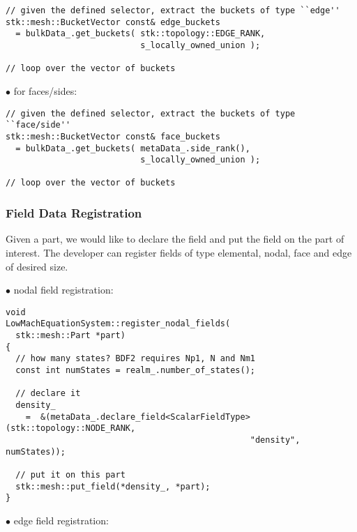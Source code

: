 \begin{lstlisting}
// given the defined selector, extract the buckets of type ``edge''
stk::mesh::BucketVector const& edge_buckets 
  = bulkData_.get_buckets( stk::topology::EDGE_RANK, 
                           s_locally_owned_union );

// loop over the vector of buckets 
\end{lstlisting}


\begin{description}
\item[$\bullet$ for faces/sides:]
\end{description}

\begin{lstlisting}
// given the defined selector, extract the buckets of type ``face/side''
stk::mesh::BucketVector const& face_buckets 
  = bulkData_.get_buckets( metaData_.side_rank(), 
                           s_locally_owned_union );

// loop over the vector of buckets 
\end{lstlisting}


\subsubsection{Field Data Registration}
Given a part, we would like to declare the field and put the field on the part of interest.
The developer can register fields of type elemental, nodal, face and edge of desired size. 

\begin{description}
\item[$\bullet$ nodal field registration:]
\end{description}

\begin{lstlisting}
void
LowMachEquationSystem::register_nodal_fields(
  stk::mesh::Part *part)
{
  // how many states? BDF2 requires Np1, N and Nm1
  const int numStates = realm_.number_of_states();

  // declare it
  density_ 
    =  &(metaData_.declare_field<ScalarFieldType>(stk::topology::NODE_RANK, 
                                                 "density", numStates));

  // put it on this part
  stk::mesh::put_field(*density_, *part);
}
\end{lstlisting}

\begin{description}
\item[$\bullet$ edge field registration:]
\end{description}

